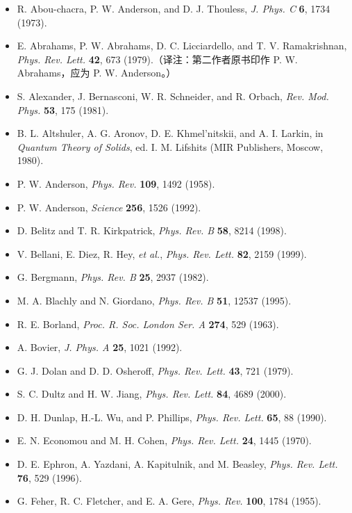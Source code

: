\begin{itemize}[leftmargin=2em,itemsep=0pt,parsep=0pt,label={}]
\item [AAT1973] R. Abou-chacra, P. W. Anderson, and D. J. Thouless, \emph{J. Phys. C} \textbf{6}, 1734 (1973).
\item [A1979] E. Abrahams, P. W. Abrahams, D. C. Licciardello, and T. V. Ramakrishnan, \emph{Phys. Rev. Lett.} \textbf{42}, 673 (1979).（译注：第二作者原书印作 P. W. Abrahams，应为 P. W. Anderson。）
\item [A1981] S. Alexander, J. Bernasconi, W. R. Schneider, and R. Orbach, \emph{Rev. Mod. Phys.} \textbf{53}, 175 (1981).
\item [A1980] B. L. Altshuler, A. G. Aronov, D. E. Khmel'nitskii, and A. I. Larkin, in \emph{Quantum Theory of Solids}, ed. I. M. Lifshits (MIR Publishers, Moscow, 1980).
\item [A1958] P. W. Anderson, \emph{Phys. Rev.} \textbf{109}, 1492 (1958).
\item [A1992] P. W. Anderson, \emph{Science} \textbf{256}, 1526 (1992).
\item [BK1998] D. Belitz and T. R. Kirkpatrick, \emph{Phys. Rev. B} \textbf{58}, 8214 (1998).
\item [B1999] V. Bellani, E. Diez, R. Hey, \emph{et al.}, \emph{Phys. Rev. Lett.} \textbf{82}, 2159 (1999).
\item [B1982] G. Bergmann, \emph{Phys. Rev. B} \textbf{25}, 2937 (1982).
\item [BG1995] M. A. Blachly and N. Giordano, \emph{Phys. Rev. B} \textbf{51}, 12537 (1995).
\item [B1963] R. E. Borland, \emph{Proc. R. Soc. London Ser. A} \textbf{274}, 529 (1963).
\item [B1992] A. Bovier, \emph{J. Phys. A} \textbf{25}, 1021 (1992).
\item [DO1979] G. J. Dolan and D. D. Osheroff, \emph{Phys. Rev. Lett.} \textbf{43}, 721 (1979).
\item [DJ2000] S. C. Dultz and H. W. Jiang, \emph{Phys. Rev. Lett.} \textbf{84}, 4689 (2000).
\item [DWP1990] D. H. Dunlap, H.-L. Wu, and P. Phillips, \emph{Phys. Rev. Lett.} \textbf{65}, 88 (1990).
\item [EC1970] E. N. Economou and M. H. Cohen, \emph{Phys. Rev. Lett.} \textbf{24}, 1445 (1970).
\item [E1996] D. E. Ephron, A. Yazdani, A. Kapitulnik, and M. Beasley, \emph{Phys. Rev. Lett.} \textbf{76}, 529 (1996).
\item [FFG1955] G. Feher, R. C. Fletcher, and E. A. Gere, \emph{Phys. Rev.} \textbf{100}, 1784 (1955).

\end{itemize}
